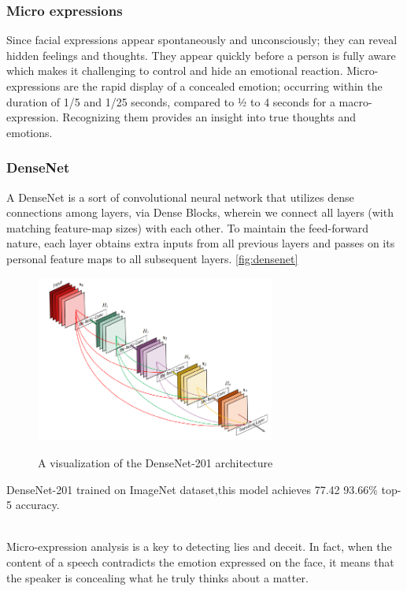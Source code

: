 


\subsubsection{Micro expressions}
Since facial expressions appear spontaneously and unconsciously; they can reveal hidden feelings and thoughts.
They appear quickly before a person is fully aware which makes it challenging to control and hide an emotional reaction. Micro-expressions are the rapid display of a concealed emotion; occurring within the duration of 1/5 and 1/25 seconds, compared to ½ to 4 seconds for a macro-expression.
Recognizing them provides an insight into true thoughts and emotions.

\subsubsection{DenseNet}
A DenseNet is a sort of convolutional neural network that utilizes dense 
connections among layers, via Dense Blocks, wherein we connect all layers (with 
matching feature-map sizes) with each other. To maintain the feed-forward 
nature, each layer obtains extra inputs from all previous layers and passes on its 
personal feature maps to all subsequent layers.
\autoref{fig:densenet}
\begin{figure}[H]
    \centering
    \includegraphics[width=0.7\textwidth]{figures/A-visualization-of-the-DenseNet-201-architecture-Each-layer-takes-all-preceding.png}
    \caption{A visualization of the DenseNet-201 architecture}
    \label{fig:densenet}
    \cite{denseNet}
\end{figure}
DenseNet-201 trained on ImageNet dataset,this model achieves 77.42%
93.66\% top-5 accuracy.


\\
Micro-expression analysis is a key to detecting lies and deceit. In fact, when the content of a speech contradicts the emotion expressed on the face, it means that the speaker is concealing what he truly thinks about a matter. 

